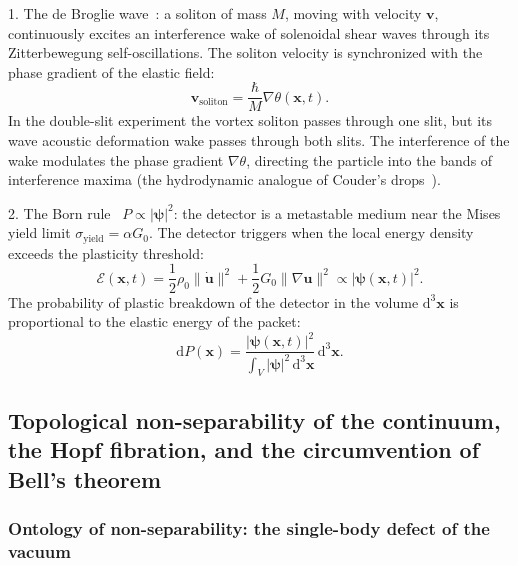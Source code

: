 \documentclass[11pt,a4paper]{article}
\theoremstyle{definition}
\theoremstyle{remark}
\begin{document}
1. The de Broglie wave~\cite{deBroglie1927}: a soliton of mass $M$, moving with velocity $\mathbf{v}$, continuously excites an interference wake of solenoidal shear waves through its Zitterbewegung self-oscillations. The soliton velocity is synchronized with the phase gradient of the elastic field:
\begin{equation}
	\mathbf{v}_{\mathrm{soliton}} = \frac{\hbar}{M} \nabla\theta(\mathbf{x}, t).
	\label{eq:de_broglie_guidance}
\end{equation}
In the double-slit experiment the vortex soliton passes through one slit, but its wave acoustic deformation wake passes through both slits. The interference of the wake modulates the phase gradient $\nabla\theta$, directing the particle into the bands of interference maxima (the hydrodynamic analogue of Couder's drops~\cite{CouderFort2006}).

2. The Born rule~\cite{Born1926} $P \propto |\boldsymbol{\psi}|^2$: the detector is a metastable medium near the Mises yield limit $\sigma_{\mathrm{yield}} = \alpha G_0$. The detector triggers when the local energy density exceeds the plasticity threshold:
\begin{equation}
    \mathcal{E}(\mathbf{x}, t) = \frac{1}{2}\rho_0 \|\dot{\mathbf{u}}\|^2 + \frac{1}{2}G_0 \|\nabla\mathbf{u}\|^2 \propto |\boldsymbol{\psi}(\mathbf{x}, t)|^2.
    \label{eq:born_energy_proportionality}
\end{equation}
The probability of plastic breakdown of the detector in the volume $\mathrm{d}^3\mathbf{x}$ is proportional to the elastic energy of the packet:
\begin{equation}
	\mathrm{d}P(\mathbf{x}) = \frac{|\boldsymbol{\psi}(\mathbf{x}, t)|^2}{\int_V |\boldsymbol{\psi}|^2 \, \mathrm{d}^3\mathbf{x}} \, \mathrm{d}^3\mathbf{x}.
	\label{eq:born_probability_exact}
\end{equation}

\subsection{Topological non-separability of the continuum, the Hopf fibration, and the circumvention of Bell's theorem}

\subsubsection{Ontology of non-separability: the single-body defect of the vacuum}
\end{document}
